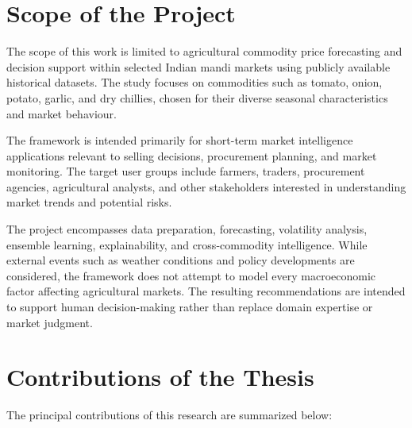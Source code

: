 \documentclass[12pt,a4paper]{report}
\theoremstyle{definition}
\theoremstyle{remark}
\begin{document}
\section{Scope of the Project}

The scope of this work is limited to agricultural commodity price forecasting and decision support within selected Indian mandi markets using publicly available historical datasets. The study focuses on commodities such as tomato, onion, potato, garlic, and dry chillies, chosen for their diverse seasonal characteristics and market behaviour.

The framework is intended primarily for short-term market intelligence applications relevant to selling decisions, procurement planning, and market monitoring. The target user groups include farmers, traders, procurement agencies, agricultural analysts, and other stakeholders interested in understanding market trends and potential risks.

The project encompasses data preparation, forecasting, volatility analysis, ensemble learning, explainability, and cross-commodity intelligence. While external events such as weather conditions and policy developments are considered, the framework does not attempt to model every macroeconomic factor affecting agricultural markets. The resulting recommendations are intended to support human decision-making rather than replace domain expertise or market judgment.

\section{Contributions of the Thesis}

The principal contributions of this research are summarized below:
\end{document}
